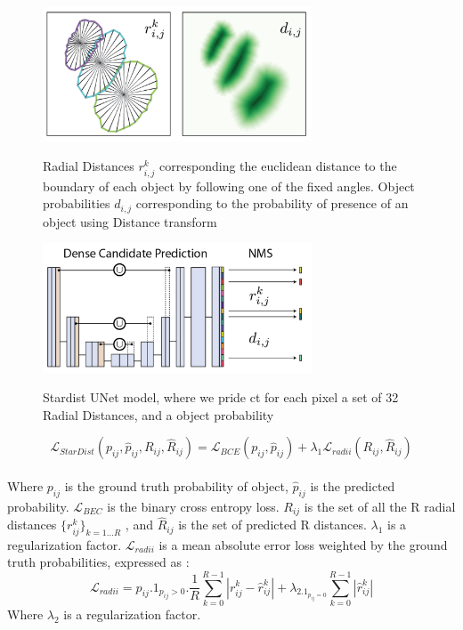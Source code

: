 \documentclass[main.tex]{subfiles}
\begin{document}
\begin{figure}[H]
    \centering  
    \begin{multicols}{2}
    \includegraphics[width=8cm]{images/radialDistances.PNG}
    \caption{Radial Distances $r_{i,j}^{k}$ corresponding the euclidean distance to the boundary of each object by following one of the fixed angles. Object probabilities $d_{i,j}$ corresponding to the probability of presence of an object using Distance transform}
    \label{fig:radial}
    \includegraphics[width=8cm]{images/UnetStarDist.PNG}
    \caption{Stardist UNet model, where we pride ct for each pixel a set of 32 Radial Distances, and a object probability}

    \end{multicols}

    \label{fig:ac}
\end{figure}

\begin{equation}
    \mathcal{L}_{\mathit{StarDist}}(p_{ij}, \hat{p}_{ij}, R_{ij}, \hat{R}_{ij}) = \mathcal{L}_{\mathit{BCE}}(p_{ij}, \hat{p}_{ij}) + \lambda_1\mathcal{L}_{\mathit{radii}}(R_{ij}, \hat{R}_{ij}) 
    \label{eq:loss}
\end{equation}\\
Where $p_{ij}$ is the ground truth probability of object, $\hat{p}_{ij}$  is the predicted probability. $\mathcal{L}_{\mathit{BEC}}$ is the binary cross entropy loss. $R_{ij}$ is the set of all the R radial distances $\{r_{ij}^{k}\}_{k=1 \dots R}$ , and $\hat{R}_{ij}$ is the set of predicted R distances. $\lambda_1$ is a regularization factor. $\mathcal{L}_{\mathit{radii}}$ is a mean absolute error loss weighted by the ground truth probabilities, expressed as :
\begin{equation}
    \mathcal{L}_{\mathit{radii}} = p_{ij}.1_{p_{ij}>0}.\frac{1}{R}\sum_{k=0}^{R-1}|r_{ij}^{k}-\hat{r}_{ij}^{k}| + \lambda_2.1_{p_{ij}=0}\sum_{k=0}^{R-1}|\hat{r}_{ij}^{k}|
    \label{eq:lossradii}
\end{equation}
Where $\lambda_2$ is a regularization factor.\\
\end{document}
